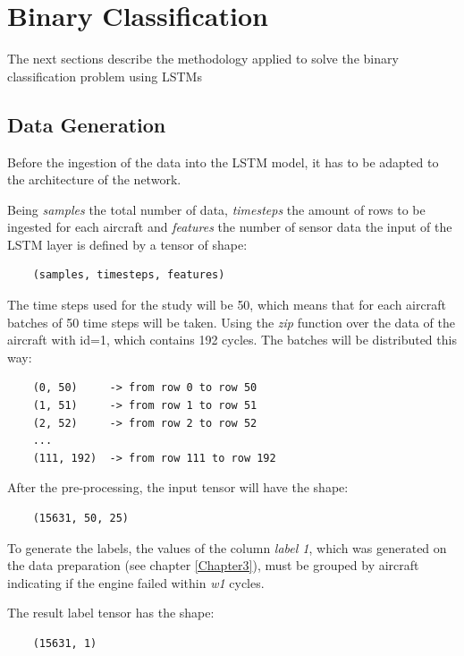 \section{Binary Classification}

The next sections describe the methodology applied to solve the binary classification problem using LSTMs

\subsection{Data Generation}

Before the ingestion of the data into the LSTM model, it has to be adapted to the architecture of the network.

Being \textit{samples} the total number of data, \textit{timesteps} the amount of rows to be ingested for each aircraft and \textit{features} the number of sensor data the input of the LSTM layer is defined by a tensor of shape:

\begin{verbatim}
    (samples, timesteps, features)
\end{verbatim}

The time steps used for the study will be 50, which means that for each aircraft batches of 50 time steps will be taken.
Using the \textit{zip} function over the data of the aircraft with id=1, which contains 192 cycles. The batches will be distributed this way:

\begin{verbatim}
    (0, 50)     -> from row 0 to row 50
    (1, 51)     -> from row 1 to row 51
    (2, 52)     -> from row 2 to row 52
    ...
    (111, 192)  -> from row 111 to row 192
\end{verbatim}

After the pre-processing, the input tensor will have the shape:

\begin{verbatim}
    (15631, 50, 25)
\end{verbatim}

To generate the labels, the values of the column \textit{label 1}, which was generated on the data preparation (see chapter \ref{Chapter3}), must be grouped by aircraft indicating if the engine failed within \textit{w1} cycles.

The result label tensor has the shape:

\begin{verbatim}
    (15631, 1)
\end{verbatim}

